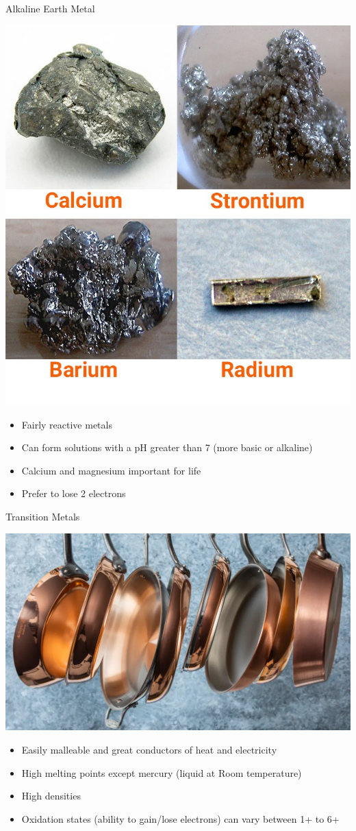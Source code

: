 \documentclass[11pt]{beamer}
\begin{document}
\begin{frame}{Alkaline Earth Metal}
  \begin{center}
    \includegraphics[width=0.4\linewidth]{alkaline_metal}
  \end{center}
  
  \begin{itemize}
  \item Fairly reactive metals
  \item Can form solutions with a pH greater than
    7 (more basic or alkaline)
  \item Calcium and magnesium important for life
  \item Prefer to lose 2 electrons
  \end{itemize}
\end{frame}

\begin{frame}{Transition Metals}
  \begin{center}
    \includegraphics[scale=0.12]{copper_pan}
  \end{center}
  
  \begin{itemize}
  \item Easily malleable and great conductors of heat and
    electricity
  \item High melting points except mercury (liquid at Room
    temperature)
  \item High densities
  \item Oxidation states (ability to gain/lose electrons) can
    vary between 1+ to 6+
  \end{itemize}
\end{frame}
\end{document}
